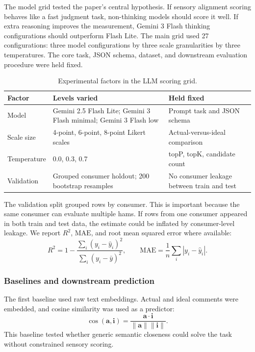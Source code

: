 \documentclass[12pt]{article}
\newcommand{\Rtwo}{\ensuremath{R^2}}
\newcommand{\mae}{\ensuremath{\mathrm{MAE}}}
\newcommand{\fl}{Gemini 2.5 Flash Lite}
\newcommand{\gthree}{Gemini 3 Flash}
\begin{document}
The model grid tested the paper's central hypothesis. If sensory alignment scoring behaves like a fast judgment task, non-thinking models should score it well. If extra reasoning improves the measurement, \gthree{} thinking configurations should outperform Flash Lite. The main grid used 27 configurations: three model configurations by three scale granularities by three temperatures. The core task, JSON schema, dataset, and downstream evaluation procedure were held fixed.

\begin{table}[ht]
\centering
\caption{Experimental factors in the LLM scoring grid.}
\label{tab:grid}
\small
\begin{tabular}{p{}p{}p{}}
\toprule
Factor & Levels varied & Held fixed \\
\midrule
Model & \fl{}; \gthree{} minimal; \gthree{} low & Prompt task and JSON schema \\
Scale size & 4-point, 6-point, 8-point Likert scales & Actual-versus-ideal comparison \\
Temperature & 0.0, 0.3, 0.7 & topP, topK, candidate count \\
Validation & Grouped consumer holdout; 200 bootstrap resamples & No consumer leakage between train and test \\
\bottomrule
\end{tabular}
\end{table}

The validation split grouped rows by consumer. This is important because the same consumer can evaluate multiple hams. If rows from one consumer appeared in both train and test data, the estimate could be inflated by consumer-level leakage. We report \Rtwo{}, \mae{}, and root mean squared error where available:
\[
\Rtwo = 1 - \frac{\sum_i (y_i-\hat{y}_i)^2}{\sum_i (y_i-\bar{y})^2},
\qquad
\mae = \frac{1}{n}\sum_i |y_i-\hat{y}_i|.
\]

\subsubsection{Baselines and downstream prediction}

The first baseline used raw text embeddings. Actual and ideal comments were embedded, and cosine similarity was used as a predictor:
\[
\cos(\mathbf{a},\mathbf{i}) =
\frac{\mathbf{a}\cdot\mathbf{i}}{\|\mathbf{a}\|\|\mathbf{i}\|}.
\]
This baseline tested whether generic semantic closeness could solve the task without constrained sensory scoring.
\end{document}
